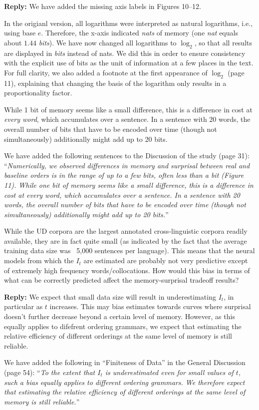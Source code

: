 \documentclass{article}[11pt,a4paper,oneside]
\newenvironment{reply}
  {\par\medskip
   \color{blue}%
   \begin{framed}
   \textbf{Reply: }\ignorespaces}
 {\end{framed}
  \medskip}
\begin{document}
\begin{reply}
We have added the missing axis labels in Figures 10--12.

In the origianl version, all logarithms were interpreted as natural logarithms, i.e., using base $e$. Therefore, the x-axis indicated \emph{nats} of memory (one \emph{nat} equals about $1.44$ \emph{bits}).
	We have now changed all logarithms to $\log_2$, so that all results are displayed in \emph{bits} instead of nats.
	We did this in order to ensure consistency with the explicit use of bits as the unit of information at a few places in the text.
	For full clarity, we also added a footnote at the first appearance of $\log_2$ (page 11), explaining that changing the basis of the logarithm only results in a proportionality factor.

	While 1 bit of memory seems like a small difference, this is a difference in cost at \emph{every word}, which accumulates over a sentence.
	In a sentence with 20 words, the overall number of bits that have to be encoded over time (though not simultaneously) additionally might add up to 20 bits.

	We have added the following sentences to the Discussion of the study (page 31):
	``\textit{Numerically, we observed differences in memory and surprisal between real and baseline
orders is in the range of up to a few bits, often less than a bit (Figure 11). While one bit of
memory seems like a small difference, this is a difference in cost at every word, which
accumulates over a sentence. In a sentence with 20 words, the overall number of bits that
have to be encoded over time (though not simultaneously) additionally might add up to 20
	bits.}''
\end{reply}

While the UD corpora are the largest annotated cross-linguistic corpora readily available, they are in fact quite small (as indicated by the fact that the average training data size was ~5,000 sentences per language). This means that the neural models from which the $I_t$ are estimated are probably not very predictive except of extremely high frequency words/collocations. How would this bias in terms of what can be correctly predicted affect the memory-surprisal tradeoff results?

\begin{reply}
	We expect that small data size will result in underestimating $I_t$, in particular as $t$ increases. This may bias estimates towards curves where surprisal doesn't further decrease beyond a certain level of memory.
However, as this equally applies to difefrent ordering grammars, we expect that estimating the relative efficiency of different orderings at the same level of memory is still reliable.

	We have added the following in ``Finiteness of Data'' in the General Discussion (page 54):
	``\textit{To the extent that $I_t$ is underestimated even for small values of $t$, such a bias equally applies to different ordering grammars. We therefore expect that estimating the relative efficiency of different orderings at the same level of memory is still reliable.}''
\end{reply}
\end{document}
